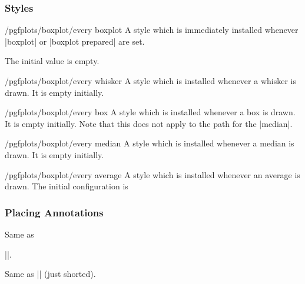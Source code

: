 \subsubsection{Styles}
\begin{stylekey}{/pgfplots/boxplot/every boxplot}
	A style which is immediately installed whenever |boxplot| or |boxplot prepared| are set.

	The initial value is empty.
\end{stylekey}

\begin{stylekey}{/pgfplots/boxplot/every whisker}
	A style which is installed whenever a whisker is drawn. It is empty initially.
\end{stylekey}
\begin{stylekey}{/pgfplots/boxplot/every box}
	A style which is installed whenever a box is drawn. It is empty initially. Note that this does not apply to the path for the |median|.
\end{stylekey}
\begin{stylekey}{/pgfplots/boxplot/every median}
	A style which is installed whenever a median is drawn. It is empty initially.
\end{stylekey}
\begin{stylekey}{/pgfplots/boxplot/every average}
	A style which is installed whenever an average is drawn. The initial configuration is
\begin{codeexample}
\end{codeexample}
\end{stylekey}


\subsubsection{Placing Annotations}

\begin{command}{\pgfplotsboxplotvalue{}}
	Same as 

	||.

\end{command}

\begin{command}{\boxplotvalue{}}
	Same as |\pgfplotsboxplotvalue| (just shorted).
\end{command}

